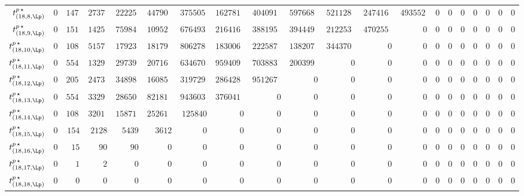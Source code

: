 \begin{tabular}{r|rrrrrrrrrrrrrrrrrrr}
  $t^{p \, \star}_{(18,8,\Lp)}$ & $0$ & $147228$ & $273746136$ & $22225847607$ & $447900504868$ & $3755054176465$ & $16278168233346$ & $40409176491852$ & $59766818030928$ & $52112811453192$ & $24741635868720$ & $4935528378000$ & $0$ & $0$ & $0$ & $0$ & $0$ & $0$ & $0$ \\
  $t^{p \, \star}_{(18,9,\Lp)}$ & $0$ & $151945$ & $142526922$ & $7598454144$ & $109523800880$ & $676493783215$ & $2164168231758$ & $3881957154166$ & $3944491672768$ & $2122531773849$ & $470255200650$ & $0$ & $0$ & $0$ & $0$ & $0$ & $0$ & $0$ & $0$ \\
  $t^{p \, \star}_{(18,10,\Lp)}$ & $0$ & $108692$ & $51575344$ & $1792394388$ & $18179837376$ & $80627854715$ & $183006754854$ & $222587889678$ & $138207036864$ & $34437042432$ & $0$ & $0$ & $0$ & $0$ & $0$ & $0$ & $0$ & $0$ & $0$ \\
  $t^{p \, \star}_{(18,11,\Lp)}$ & $0$ & $55445$ & $13293790$ & $297393048$ & $2071655544$ & $6346705800$ & $9594097632$ & $7038837582$ & $2003990352$ & $0$ & $0$ & $0$ & $0$ & $0$ & $0$ & $0$ & $0$ & $0$ & $0$ \\
  $t^{p \, \star}_{(18,12,\Lp)}$ & $0$ & $20503$ & $2473498$ & $34898331$ & $160855580$ & $319729470$ & $286428372$ & $95126724$ & $0$ & $0$ & $0$ & $0$ & $0$ & $0$ & $0$ & $0$ & $0$ & $0$ & $0$ \\
  $t^{p \, \star}_{(18,13,\Lp)}$ & $0$ & $5541$ & $332930$ & $2865000$ & $8218192$ & $9436035$ & $3760410$ & $0$ & $0$ & $0$ & $0$ & $0$ & $0$ & $0$ & $0$ & $0$ & $0$ & $0$ & $0$ \\
  $t^{p \, \star}_{(18,14,\Lp)}$ & $0$ & $1089$ & $32014$ & $158712$ & $252616$ & $125840$ & $0$ & $0$ & $0$ & $0$ & $0$ & $0$ & $0$ & $0$ & $0$ & $0$ & $0$ & $0$ & $0$ \\
  $t^{p \, \star}_{(18,15,\Lp)}$ & $0$ & $154$ & $2128$ & $5439$ & $3612$ & $0$ & $0$ & $0$ & $0$ & $0$ & $0$ & $0$ & $0$ & $0$ & $0$ & $0$ & $0$ & $0$ & $0$ \\
  $t^{p \, \star}_{(18,16,\Lp)}$ & $0$ & $15$ & $90$ & $90$ & $0$ & $0$ & $0$ & $0$ & $0$ & $0$ & $0$ & $0$ & $0$ & $0$ & $0$ & $0$ & $0$ & $0$ & $0$ \\
  $t^{p \, \star}_{(18,17,\Lp)}$ & $0$ & $1$ & $2$ & $0$ & $0$ & $0$ & $0$ & $0$ & $0$ & $0$ & $0$ & $0$ & $0$ & $0$ & $0$ & $0$ & $0$ & $0$ & $0$ \\
  $t^{p \, \star}_{(18,18,\Lp)}$ & $0$ & $0$ & $0$ & $0$ & $0$ & $0$ & $0$ & $0$ & $0$ & $0$ & $0$ & $0$ & $0$ & $0$ & $0$ & $0$ & $0$ & $0$ & $0$ \\
\end{tabular}
